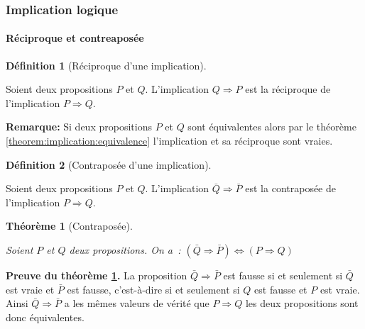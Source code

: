 \documentclass[10pt,notheorems]{beamer}
\theoremstyle{plain}
\newtheorem{theorem}{Théorème}
\theoremstyle{definition} %
\newtheorem{definition}{Définition}
\begin{document}
\begin{frame}
  \frametitle{Implication logique}
  \framesubtitle{Réciproque et contreaposée}
  \hypertarget{slide_reciproque_et_contraposee}{}

  \begin{definition}[Réciproque d'une implication]\label{def:implication:equivalence}

    Soient deux propositions $P$ et $Q$. L'implication $Q\Rightarrow P$ est la réciproque de l'implication $P\Rightarrow Q$.
  \end{definition}

  \bigskip

  \textbf{Remarque:} Si deux propositions $P$ et $Q$ sont équivalentes alors par le théorème \hyperlink{slide_implication_et_equivalence_1}{\ref{theorem:implication:equivalence}} l'implication et sa réciproque sont vraies.

  \bigskip

  \begin{definition}[Contraposée d'une implication]\label{def:implication:contraposee}

    Soient deux propositions $P$ et $Q$. L'implication $\bar Q\Rightarrow \bar P$ est la contraposée de l'implication $P\Rightarrow Q$.
  \end{definition}

  \bigskip

  \begin{theorem}[Contraposée]\label{theorem:implication:contraposee}

    Soient $P$ et $Q$ deux propositions. On a~: $(\bar Q \Rightarrow \bar P) \Leftrightarrow (P\Rightarrow Q)$
  \end{theorem}
\end{frame}

\begin{notes}

  \textbf{Preuve du théorème \hyperlink{slide_reciproque_et_contraposee}{\ref{theorem:implication:contraposee}}.} La proposition
  $\bar Q \Rightarrow \bar P$ est fausse si et seulement si $\bar Q$
  est vraie et $\bar P$ est fausse, c'est-à-dire si et seulement si $Q$
  est fausse et $P$ est vraie. Ainsi $\bar Q \Rightarrow \bar P$ a les
  mêmes valeurs de vérité que $P\Rightarrow Q$ les deux propositions
  sont donc équivalentes.

\end{notes}
\end{document}

